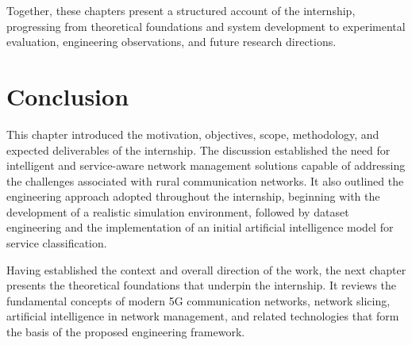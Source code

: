 \documentclass[12pt,a4paper]{report}
\begin{document}
	Together, these chapters present a structured account of the internship, progressing from theoretical foundations and system development to experimental evaluation, engineering observations, and future research directions.
	
	
	\section{Conclusion}
	
	This chapter introduced the motivation, objectives, scope, methodology, and expected deliverables of the internship. The discussion established the need for intelligent and service-aware network management solutions capable of addressing the challenges associated with rural communication networks. It also outlined the engineering approach adopted throughout the internship, beginning with the development of a realistic simulation environment, followed by dataset engineering and the implementation of an initial artificial intelligence model for service classification.
	
	Having established the context and overall direction of the work, the next chapter presents the theoretical foundations that underpin the internship. It reviews the fundamental concepts of modern 5G communication networks, network slicing, artificial intelligence in network management, and related technologies that form the basis of the proposed engineering framework.
	
\end{document}

